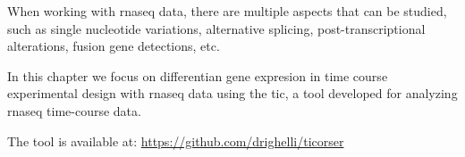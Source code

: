 When working with \gls{rnaseq} data, there are multiple aspects that can be studied, such as single nucleotide variations, alternative splicing, post-transcriptional alterations, fusion gene detections, etc.

In this chapter we focus on differentian gene expresion in time course experimental design with \gls{rnaseq} data using the \gls{tic}, a tool developed for analyzing \gls{rnaseq} time-course data.

The tool is available at: \url{https://github.com/drighelli/ticorser}
